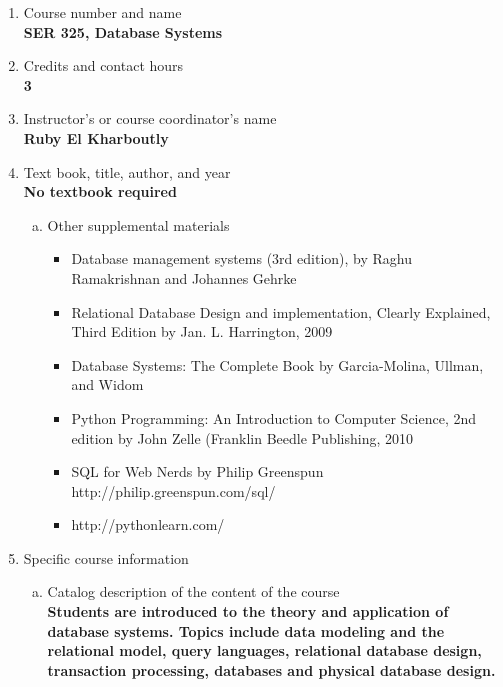 \label{SER325}  %
\begin{enumerate}[1.]
\item Course number and name\\
  {\bfseries
    SER 325, Database Systems
  }

\item Credits and contact hours\\
  {\bfseries
    3  %
  }

\item Instructor's or course coordinator's name\\
  {\bfseries
    Ruby El Kharboutly
  }

\item Text book, title, author, and year\\
  {\bfseries
    No textbook required
  }
\begin{enumerate}[a.]
\item Other supplemental materials\\
  {\bfseries
      \begin{itemize}
        \item Database management systems (3rd edition), by Raghu Ramakrishnan and Johannes Gehrke
        \item Relational Database Design and implementation, Clearly Explained, Third Edition by Jan. L.
Harrington, 2009
        \item Database Systems: The Complete Book by Garcia-Molina, Ullman, and Widom
        \item Python Programming: An Introduction to Computer Science, 2nd edition by John Zelle (Franklin
Beedle Publishing, 2010
        \item SQL for Web Nerds by Philip Greenspun http://philip.greenspun.com/sql/
        \item http://pythonlearn.com/
      \end{itemize}
  }
\end{enumerate}

\item Specific course information
\begin{enumerate}[a.]
\item Catalog description of the content of the course\\
  {\bfseries
    Students are introduced to the theory and application of database systems. Topics include data
modeling and the relational model, query languages, relational database design, transaction
processing, databases and physical database design.
  }


\end{enumerate}
\end{enumerate}
